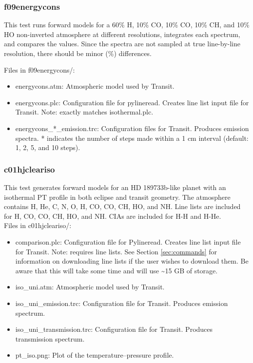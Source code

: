\documentclass[letterpaper, 12pt]{article}
\begin{document}
\subsubsection{f09energycons}
\label{sec:energycons}
This test runs forward models for a 60\% H, 10\% CO, 10\% CO, 10\% CH, and 10\% HO non-inverted atmosphere at different resolutions, integrates each spectrum, and compares the values. Since the spectra are not sampled at true line-by-line resolution, there should be minor (\%) differences.

Files in f09energycons/:
\begin{itemize} \itemsep0pt
  \item energycons.atm: Atmospheric model used by Transit.
  \item energycons.plc: Configuration file for pylineread. Creates 
        line list input file for Transit. Note: exactly matches isothermal.plc.
  \item energycons{\_}*{\_}emission.trc: Configuration files for Transit. Produces 
        emission spectra. * indicates the number of steps made within a 1 cm interval (default: 1, 2, 5, and 10 steps).
\end{itemize}

\subsubsection{c01hjcleariso}
\label{sec:comp-iso}
This test generates forward models for an HD 189733b-like planet with an isothermal PT profile in both eclipse and transit geometry. The atmosphere contains H, He, C, N, O, H, 
CO, CO, CH, HO, and NH. Line lists are 
included for H, CO, CO, CH, HO, and NH. CIAs 
are included for H-H and H-He.\\

Files in c01hjcleariso/:
\begin{itemize} \itemsep0pt
  \item comparison.plc: Configuration file for Pylineread. Creates 
        line list input file for Transit. Note: requires line lists. See 
        Section \ref{sec:commands} for information on downloading line lists if 
        the user wishes to download them. Be aware that this will take some 
        time and will use {\sim}15 GB of storage.
  \item iso{\_}uni.atm: Atmospheric model used by Transit.
  \item iso{\_}uni{\_}emission.trc: Configuration file for Transit. Produces 
        emission spectrum.
  \item iso{\_}uni{\_}transmission.trc: Configuration file for Transit. Produces 
        transmission spectrum.
  \item pt{\_}iso.png: Plot of the temperature--pressure profile.
\end{itemize}
\end{document}
